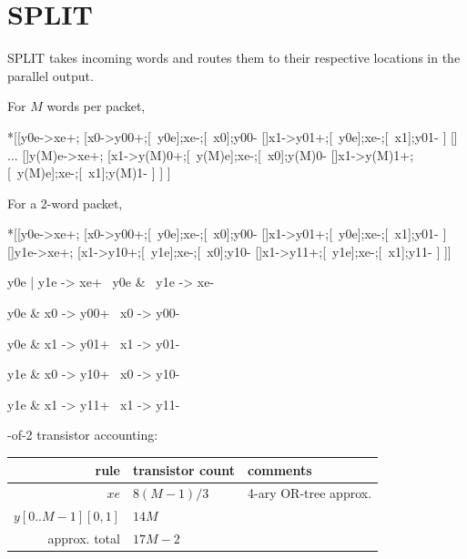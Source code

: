 \documentclass{article}
\begin{document}
\section{SPLIT \label{sec:DESERIAL_SPLITCHAIN_SPLIT}}

SPLIT takes incoming words and routes them to their respective locations
in the parallel output.

\noindent
For $M$ words per packet,

\begin{hse}
*[[y0e->xe+;
    [x0->y00+;[~y0e];xe-;[~x0];y00-
    []x1->y01+;[~y0e];xe-;[~x1];y01-
    ]
  [] ...
  []y(M)e->xe+;
    [x1->y(M)0+;[~y(M)e];xe-;[~x0];y(M)0-
    []x1->y(M)1+;[~y(M)e];xe-;[~x1];y(M)1-
    ]
  ]
 ]
\end{hse}

\noindent
For a 2-word packet,

\begin{hse}
*[[y0e->xe+;
    [x0->y00+;[~y0e];xe-;[~x0];y00-
    []x1->y01+;[~y0e];xe-;[~x1];y01-
    ]
  []y1e->xe+;
    [x1->y10+;[~y1e];xe-;[~x0];y10-
    []x1->y11+;[~y1e];xe-;[~x1];y11-
    ]
 ]]
\end{hse}

\begin{prs2}
y0e | y1e -> xe+
~y0e & ~y1e -> xe-
\end{prs2}

\begin{prs2}
y0e & x0 -> y00+
~x0 -> y00-

y0e & x1 -> y01+
~x1 -> y01-
\end{prs2}

\begin{prs2}
y1e & x0 -> y10+
~x0 -> y10-

y1e & x1 -> y11+
~x1 -> y11-
\end{prs2}

-of-2 transistor accounting:

\begin{center}
    \begin{tabular}{|r|l|l|}
    \hline
    rule & transistor count & comments \\ \hline
    $xe$ & $8(M-1)/3$ & 4-ary OR-tree approx. \\ \hline
    $y[0..M-1][0,1]$ & $14M$ & \\ \hline
    \hline approx. total & $17M-2$ & \\ \hline
    \end{tabular}
\end{center}
\end{document}
